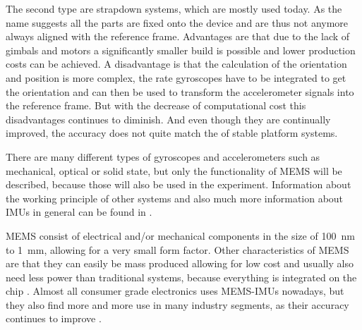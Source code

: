 The second type are strapdown systems, which are mostly used today. 
As the name suggests all the parts are fixed onto the device and are thus not anymore always aligned with the reference frame.
Advantages are that due to the lack of gimbals and motors a significantly smaller build is possible and lower production costs can be achieved.
A disadvantage is that the calculation of the orientation and position is more complex, the rate gyroscopes have to be integrated to get the orientation and can then be used to transform the accelerometer signals into the reference frame.
But with the decrease of computational cost this disadvantages continues to diminish. And even though they are continually improved, the accuracy does not quite match the of stable platform systems.

There are many different types of gyroscopes and accelerometers such as mechanical, optical or solid state, but only the functionality of MEMS will be described, because those will also be used in the experiment.
Information about the working principle of other systems and also much more information about IMUs in general can be found in \cite{Woodman07anintroduction}.

MEMS consist of electrical and/or mechanical components in the size of \SI{100}{\nano\metre} to \SI{1}{\milli\metre}, allowing for a very small form factor.
Other characteristics of MEMS are that they can easily be mass produced allowing for low cost and usually also need less power than traditional systems, because everything is integrated on the chip \cite{Shaeffer2013}.
Almost all consumer grade electronics uses MEMS-IMUs nowadays, but they also find more and more use in many industry segments, as their accuracy continues to improve \cite{Perlmutter2016}.

